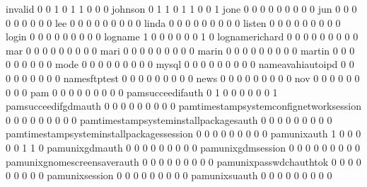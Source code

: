 \documentclass[compress,8pt]{beamer}
\begin{document}
\begin{frame}
\begin{Schunk}
  invalid                                    0   0   1   0   1   1   0   0   0
  johnson                                    0   1   1   0   1   1   0   0   1
  jone                                       0   0   0   0   0   0   0   0   0
  jun                                        0   0   0   0   0   0   0   0   0
  lee                                        0   0   0   0   0   0   0   0   0
  linda                                      0   0   0   0   0   0   0   0   0
  listen                                     0   0   0   0   0   0   0   0   0
  login                                      0   0   0   0   0   0   0   0   0
  logname                                    1   0   0   0   0   0   0   1   0
  lognamerichard                             0   0   0   0   0   0   0   0   0
  mar                                        0   0   0   0   0   0   0   0   0
  mari                                       0   0   0   0   0   0   0   0   0
  marin                                      0   0   0   0   0   0   0   0   0
  martin                                     0   0   0   0   0   0   0   0   0
  mode                                       0   0   0   0   0   0   0   0   0
  mysql                                      0   0   0   0   0   0   0   0   0
  nameavahiautoipd                           0   0   0   0   0   0   0   0   0
  namesftptest                               0   0   0   0   0   0   0   0   0
  news                                       0   0   0   0   0   0   0   0   0
  nov                                        0   0   0   0   0   0   0   0   0
  pam                                        0   0   0   0   0   0   0   0   0
  pamsucceedifauth                           0   1   0   0   0   0   0   0   1
  pamsucceedifgdmauth                        0   0   0   0   0   0   0   0   0
  pamtimestampsystemconfignetworksession     0   0   0   0   0   0   0   0   0
  pamtimestampsysteminstallpackagesauth      0   0   0   0   0   0   0   0   0
  pamtimestampsysteminstallpackagessession   0   0   0   0   0   0   0   0   0
  pamunixauth                                1   0   0   0   0   0   1   1   0
  pamunixgdmauth                             0   0   0   0   0   0   0   0   0
  pamunixgdmsession                          0   0   0   0   0   0   0   0   0
  pamunixgnomescreensaverauth                0   0   0   0   0   0   0   0   0
  pamunixpasswdchauthtok                     0   0   0   0   0   0   0   0   0
  pamunixsession                             0   0   0   0   0   0   0   0   0
  pamunixsuauth                              0   0   0   0   0   0   0   0   0

\end{Schunk}
\end{frame}
\end{document}
